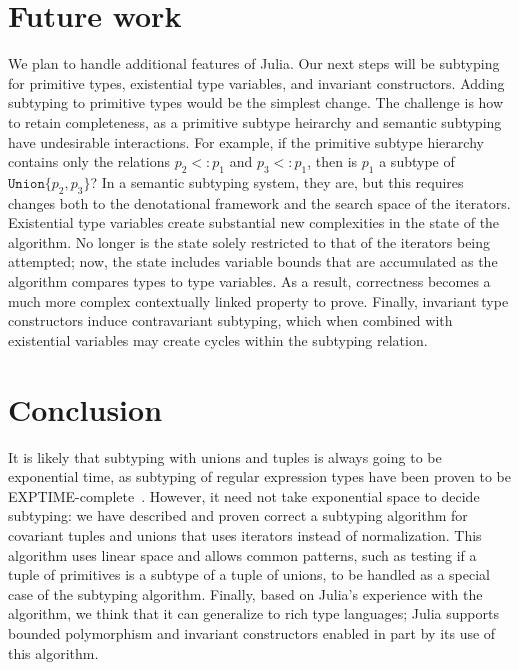 \documentclass[a4paper,english]{lipics-v2019}
\newcommand{\xt}[1]{\texttt{#1}}
\newcommand{\union}[2]{\xt{Union\{}#1,#2\xt{\}}}
\newcommand{\sub}{<:}
\begin{document}
\section{Future work}

We plan to handle additional features of Julia. Our
next steps will be subtyping for primitive types, existential type variables,
and invariant constructors.  Adding subtyping to primitive types would be the
simplest change. The challenge is how to retain completeness, as a primitive
subtype heirarchy and semantic subtyping have undesirable interactions.  For
example, if the primitive subtype hierarchy contains only the relations $p_2
\sub p_1$ and $p_3 \sub p_1$, then is $p_1$ a subtype of $\union{p_2}{p_3}$?
In a semantic subtyping system, they are, but this requires changes both to
the denotational framework and the search space of the iterators.  Existential
type variables create substantial new complexities in the state of the
algorithm. No longer is the state solely restricted to that of the iterators
being attempted; now, the state includes variable bounds that are accumulated
as the algorithm compares types to type variables. As a result, correctness
becomes a much more complex contextually linked property to prove.  Finally,
invariant type constructors induce contravariant subtyping, which when
combined with existential variables may create cycles within the subtyping
relation.  

\section{Conclusion} It is likely that subtyping with unions and tuples is
always going to be exponential time, as subtyping of regular expression types
have been proven to be EXPTIME-complete~\cite{unionexptime}. However, it need
not take exponential space to decide subtyping: we have described and proven
correct a subtyping algorithm for covariant tuples and unions that uses
iterators instead of normalization. This algorithm uses linear space and
allows common patterns, such as testing if a tuple of primitives is a subtype
of a tuple of unions, to be handled as a special case of the subtyping
algorithm. Finally, based on Julia's experience with the algorithm, we think
that it can generalize to rich type languages; Julia supports bounded
polymorphism and invariant constructors enabled in part by its use of this
algorithm.



\medskip
\end{document}
